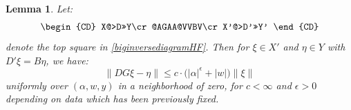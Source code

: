 \documentclass[12pt]{article}
\newtheorem{lemma}[theorem]{Lemma}
\theoremstyle{definition}
\theoremstyle{remark}
\numberwithin{equation}{subsection}
\begin{document}
\begin{lemma}\label{approxtopHF}
Let:
\begin{equation}
\begin{CD}
X@>D>>Y\cr
@AGAA@VVBV\cr
X'@>D'>>Y'
\end{CD}
\end{equation}
denote the top square in \eqref{biginversediagramHF}.  Then for $\xi\in X'$ and $\eta\in Y$ with $D'\xi=B\eta$, we have:
\begin{equation}
\left\|DG\xi-\eta\right\|\leq c\cdot\bigl(\left|\alpha\right|^\epsilon+\left|w\right|\bigr)\left\|\xi\right\|
\end{equation}
uniformly over $(\alpha,w,y)$ in a neighborhood of zero, for $c<\infty$ and $\epsilon>0$ depending on data which has been previously fixed.
\end{lemma}
\end{document}
